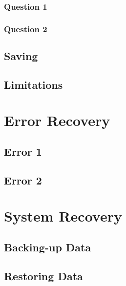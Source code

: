 \subsubsection{Question 1}

\subsubsection{Question 2}

\subsection{Saving}

\subsection{Limitations}

\section{Error Recovery}

\subsection{Error 1}

\subsection{Error 2}

\section{System Recovery}

\subsection{Backing-up Data}

\subsection{Restoring Data}